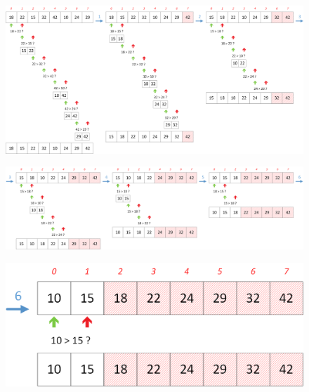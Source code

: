 \documentclass[11pt,a4paper]{article}
\begin{document}
\begin{figure}[ht!]
\centering
\centerline{
\includegraphics[width=1.2\textwidth]{img/BubbleSort_part1.png}
}
\end{figure}

\begin{figure}[ht!]
\centering
\centerline{
\includegraphics[width=1.2\textwidth]{img/BubbleSort_part2_1.png}
}
\end{figure}


\begin{figure}[ht!]
\centering
\centerline{
\includegraphics[scale=0.48]{img/BubbleSort_part2_2.png}
}
\end{figure}
\end{document}
